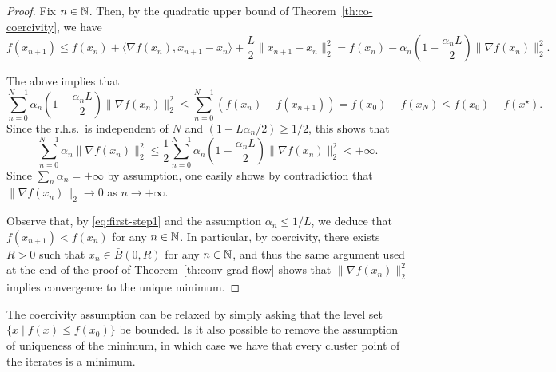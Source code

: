      \begin{proof}
         Fix $n\in\mathbb{N}$.
         Then, by the quadratic upper bound of Theorem~\ref{th:co-coercivity}, we have
         \begin{equation}
             \label{eq:first-step1}
             f(x_{n+1})
             \le f(x_n) + \langle \nabla f(x_n), x_{n+1}-x_n \rangle+\frac{L}2\|x_{n+1}-x_n\|_2^2
             = f(x_n)-\alpha_n \left(1-\frac{\alpha_n L}2\right) \|\nabla f(x_n)\|_2^2.
         \end{equation}
 
         The above implies that
         \begin{equation}
             \sum_{n=0}^{N-1} \alpha_n \left(1-\frac{\alpha_n L}2\right) \|\nabla f(x_n)\|_2^2 \le \sum_{n=0}^{N-1} \left(f(x_{n})-f(x_{n+1})\right) =f(x_0) - f(x_N) \le f(x_0)-f(x^\star).
         \end{equation}
         Since the r.h.s.~is independent of $N$ and $(1-L\alpha_n/2) \ge 1/2$, this shows that
         \begin{equation}
             \sum_{n=0}^{N-1} \alpha_n  \|\nabla f(x_n)\|_2^2 \le
             \frac12\sum_{n=0}^{N-1} \alpha_n \left(1-\frac{\alpha_n L}2\right) \|\nabla f(x_n)\|_2^2 < +\infty.
         \end{equation}
         Since $\sum_n \alpha_n = +\infty$ by assumption, one easily shows by contradiction that $\|\nabla f(x_n)\|_2\rightarrow 0$ as $n\to +\infty$.
 
         Observe that, by \eqref{eq:first-step1} and the assumption $\alpha_n\le 1/L$, we deduce that $f(x_{n+1})<f(x_n)$ for any $n\in \mathbb{N}$. In particular, by coercivity, there exists $R>0$ such that $x_n\in \bar B(0,R)$ for any $n\in \mathbb{N}$, and thus the same argument used at the end of the proof of Theorem~\ref{th:conv-grad-flow} shows that $\|\nabla f(x_n)\|_2^2$ implies convergence to the unique minimum.
     \end{proof}
 
     \begin{remark}
         The coercivity assumption can be relaxed by simply asking that the level set $\{x\mid f(x)\le f(x_0)\}$ be bounded.
         Is it also possible to remove the assumption of uniqueness of the minimum, in which case we have that every cluster point of the iterates is a minimum.
     \end{remark}
 
